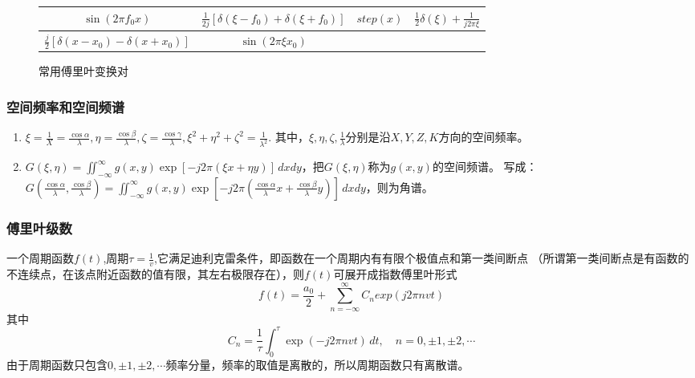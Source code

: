\documentclass[twocolumn]{ctexart}
\begin{document}
\begin{figure*}[htbp]
\begin{tabular}{|c|c|c|c|}
        \hline
        $\sin \left(2\pi f_0x\right)$                                                   & $\frac{1}{2j}\left[\delta \left(\xi -f_0\right)+\delta \left(\xi +f_0\right)\right]$ & $step\left(x\right)$                            & $\frac{1}{2}\delta \left(\xi\right) +\frac{1}{j2\pi \xi}  $                    \\
        \hline
        $\frac{j}{2}\left[\delta \left(x-x_0\right)-\delta \left(x+x_0\right)\right]$   & $\sin \left(2\pi \xi x_0\right)$                                                     &                                                 &                                                                                \\
        \hline
    \end{tabular}
    \caption{常用傅里叶变换对}
\end{figure*}

\subsubsection{空间频率和空间频谱}
\begin{enumerate}
    \item $\xi =\frac{1}{X}=\frac{\cos \alpha}{\lambda},\eta =\frac{\cos \beta}{\lambda},\zeta=\frac{\cos \gamma}{\lambda},\xi ^2 +\eta ^2 +\zeta ^2 =\frac{1}{\lambda ^2}.$
          其中，$\xi ,\eta ,\zeta ,\frac{1}{\lambda}$分别是沿$X,Y,Z,K$方向的空间频率。
    \item $G\left(\xi,\eta\right)=\iint ^{\infty} _{-\infty} g\left(x,y\right)\exp \left[-j2\pi \left(\xi x+\eta y\right)\right]\,dxdy$，把$G\left(\xi ,\eta\right)$称为$g\left(x,y\right)$的空间频谱。
          写成：$G\left(\frac{\cos \alpha}{\lambda},\frac{\cos \beta}{\lambda}\right)=\iint ^{\infty} _{-\infty} g\left(x,y\right)\exp \left[-j2\pi \left(\frac{\cos \alpha}{\lambda} x+\frac{\cos \beta}{\lambda} y\right)\right]\,dxdy$，则为角谱。
\end{enumerate}

\subsubsection{傅里叶级数}
一个周期函数$f\left(t\right)$,周期$\tau=\frac{1}{v}$,它满足迪利克雷条件，即函数在一个周期内有有限个极值点和第一类间断点
（所谓第一类间断点是有函数的不连续点，在该点附近函数的值有限，其左右极限存在），则$f\left(t\right)$可展开成指数傅里叶形式
\begin{equation}
    f\left(t\right)=\frac{a_0}{2}+\sum ^\infty _{n=-\infty}C_nexp\left(j2\pi nvt \right) \nonumber
\end{equation}
其中
\begin{equation}
    C_n=\frac{1}{\tau}\int ^\tau _0 \exp\left(-j2\pi nvt\right)\,dt,\quad n=0,\pm 1,\pm 2,\cdots \nonumber
\end{equation}
由于周期函数只包含$0,\pm 1,\pm 2,\cdots$频率分量，频率的取值是离散的，所以周期函数只有离散谱。
\end{document}
